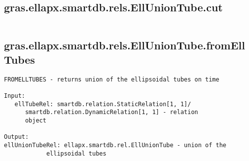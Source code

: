 \subsection{\texorpdfstring{gras.ellapx.smartdb.rels.EllUnionTube.cut}{cut}}\label{method:gras.ellapx.smartdb.rels.EllUnionTube.cut}
\begin{verbatim}

\end{verbatim}
\subsection{\texorpdfstring{gras.ellapx.smartdb.rels.EllUnionTube.fromEllTubes}{fromEllTubes}}\label{method:gras.ellapx.smartdb.rels.EllUnionTube.fromEllTubes}
\begin{verbatim}
FROMELLTUBES - returns union of the ellipsoidal tubes on time

Input:
   ellTubeRel: smartdb.relation.StaticRelation[1, 1]/
      smartdb.relation.DynamicRelation[1, 1] - relation
      object

Output:
ellUnionTubeRel: ellapx.smartdb.rel.EllUnionTube - union of the
            ellipsoidal tubes
\end{verbatim}
